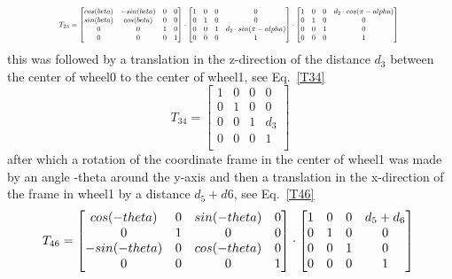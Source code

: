 \begin{equation}
\resizebox{0.8\hsize}{!}{$
    T_{23} =
    \begin{bmatrix}
    cos(beta)&-sin(beta)&0&0\\
    sin(beta)&cos(beta)&0&0\\
    0&0&1&0\\
    0&0&0&1\\
    \end{bmatrix}
    \cdot
    \begin{bmatrix}
    1&0&0&0\\
    0&1&0&0\\
    0&0&1&d_2\cdot sin(\pi-alpha)\\
    0&0&0&1\\
    \end{bmatrix}
    \cdot
    \begin{bmatrix}
    1&0&0&d_2\cdot cos(\pi-alpha)\\
    0&1&0&0\\
    0&0&1&0\\
    0&0&0&1\\
    \end{bmatrix}
    $
    }
    \label{T23}
\end{equation}
this was followed by a translation in the z-direction of the distance \(d_3\) between the center of wheel0 to the center of wheel1, see Eq.~\eqref{T34}
\begin{equation}
    T_{34} =
    \begin{bmatrix}
    1&0&0&0\\
    0&1&0&0\\
    0&0&1&d_3\\
    0&0&0&1\\
    \end{bmatrix}
    \label{T34}
\end{equation}
after which a rotation of the coordinate frame in the center of wheel1 was made by an angle -theta around the y-axis and then a translation in the x-direction of the frame in wheel1 by a distance \(d_5 + d6\), see Eq.~\eqref{T46}
\begin{equation}
    T_{46} =
    \resizebox{0.8\hsize}{!}{$
    \begin{bmatrix}
    cos(-theta)&0&sin(-theta)&0\\
    0&1&0&0\\
    -sin(-theta)&0&cos(-theta)&0\\
    0&0&0&1\\
    \end{bmatrix}
    \cdot
     \begin{bmatrix}
    1&0&0&d_5 + d_6\\
    0&1&0&0\\
    0&0&1&0\\
    0&0&0&1\\
    \end{bmatrix}
    $
    }
    \label{T46}
\end{equation}
